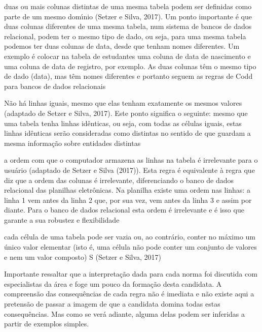 \documentclass[
12pt,		%
openright,	%
twoside,  %
a4paper,			%
chapter=TITLE,		%
english,			%
french,				%
spanish,			%
brazil				%
]{USPSC-classe/USPSC}
\begin{document}
\begin{alineas}
\item duas ou mais colunas distintas de uma mesma tabela podem ser definidas como parte de um mesmo dom\'{\i}nio  (Setzer e Silva, 2017). Um ponto importante \'e que duas colunas diferentes de uma mesma tabela, num sistema de bancos de dados relacional, podem ter o mesmo tipo de dado, ou seja, para uma mesma tabela podemos ter duas colunas de data, desde que tenham nomes diferentes. Um exemplo \'e colocar na tabela de estudantes uma coluna de data de nascimento e uma coluna de data de registro, por exemplo. As duas colunas t\^em o mesmo tipo de dado (data), mas t\^em nomes diferentes e portanto seguem as regras de Codd para bancos de dados relacionais
\item N\~ao h\'a linhas iguais, mesmo que elas tenham exatamente os mesmos valores  (adaptado de Setzer e Silva, 2017). Este ponto significa o seguinte: mesmo que uma tabela tenha linhas id\^enticas, ou seja, com todas as c\'elulas iguais, estas linhas id\^enticas ser\~ao consideradas como distintas no sentido de que guardam a mesma informa\c{c}\~ao sobre entidades distintas
\item a ordem com que o computador armazena as linhas na tabela \'e irrelevante para o usu\'ario  (adaptado de Setzer e Silva (2017)). Esta regra \'e equivalente \`a regra que diz que a ordem das colunas \'e irrelevante, diferenciando o banco de dados relacional das planilhas eletr\^onicas. Na planilha existe uma ordem nas linhas: a linha 1 vem antes da linha 2 que, por sua vez, vem antes da linha 3 e assim por diante. Para o banco de dados relacional esta ordem \'e irrelevante e \'e isso que garante a sua robustez e flexibilidade
\item cada c\'elula de uma tabela pode ser vazia ou, ao contr\'ario, conter no m\'aximo um \'unico valor elementar (isto \'e, uma c\'elula n\~ao pode conter um conjunto de valores e nem um valor composto)  S (Setzer e Silva, 2017)
\end{alineas}

Importante ressaltar que a interpreta\c{c}\~ao dada para cada norma foi discutida com especialistas da \'area e foge um pouco da forma\c{c}\~ao desta candidata. A compreens\~ao das consequ\^encias de cada regra n\~ao \'e imediata e n\~ao existe aqui a pretens\~ao de passar a imagem de que a candidata domina todas estas consequ\^encias. Mas como se ver\'a adiante, alguma delas podem ser inferidas a partir de exemplos simples.
\end{document}
